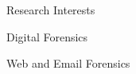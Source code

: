 \begin{rSection}{Research Interests}

  \begin{rBulletList}[2]

    \item Digital Forensics

    \item Web and Email Forensics


  \end{rBulletList}

\end{rSection}
